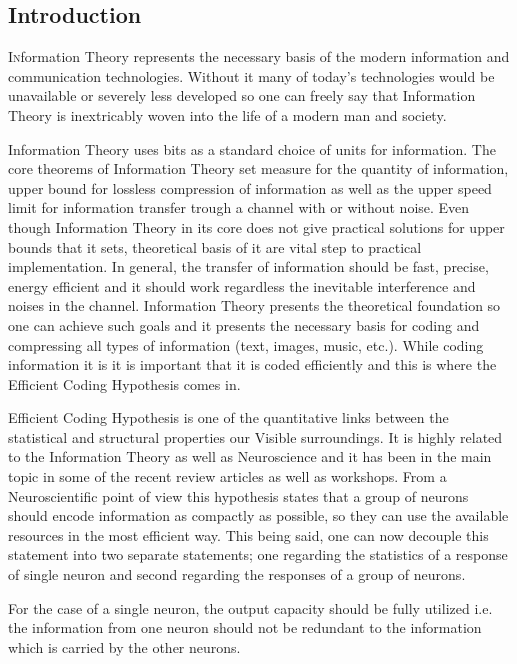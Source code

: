 \documentclass[twoside]{article}
\begin{document}
\begin{multicols}{2} %

\section{Introduction}

\lettrine[nindent=0em,lines=3]{I}nformation Theory represents the necessary basis of the modern information and communication technologies. Without it many of today’s technologies would be unavailable or severely less developed so one can freely say that Information Theory is inextricably woven into the life of a modern man and society.

Information Theory uses bits as a standard choice of units for information.
The core theorems of Information Theory set measure for the quantity of information, upper bound for lossless compression of information as well as the upper speed limit for information transfer trough a channel with or without noise. Even though Information Theory in its core does not give practical solutions for upper bounds that it sets, theoretical basis of it are vital step to practical implementation.  In general, the transfer of information should be fast, precise, energy efficient and it should work regardless the inevitable interference and noises in the channel. Information Theory presents the theoretical foundation so one can achieve such goals and it presents the necessary basis for coding and compressing all types of information (text, images, music, etc.). While coding information it is it is important that it is coded efficiently and this is where the Efficient Coding Hypothesis comes in. 

Efficient Coding Hypothesis is one of the quantitative links between the statistical and structural properties our Visible surroundings. It is highly related to the Information Theory as well as Neuroscience and it has been in the main topic in some of the recent review articles as well as workshops. 
From a Neuroscientific point of view this hypothesis states that a group of neurons should encode information as compactly as possible, so they can use the available resources in the most efficient way. This being said, one can now decouple this statement into two separate statements; one regarding the statistics of a response of single neuron and second regarding the responses of a group of neurons. 

For the case of a single neuron, the output capacity should be fully utilized i.e. the information from one neuron should not be redundant to the information which is carried by the other neurons. 


\end{multicols}
\end{document}
